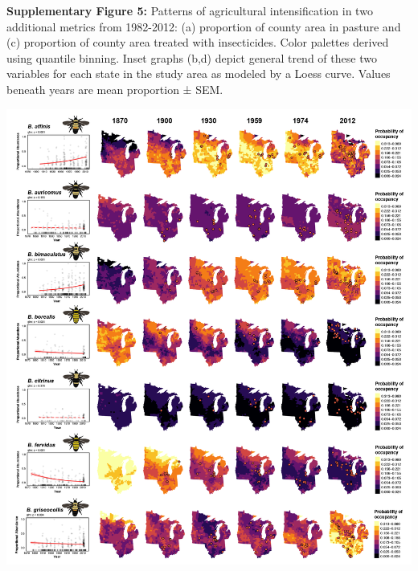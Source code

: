 \documentclass[11pt,]{article}
\begin{document}
\textbf{Supplementary Figure 5:} Patterns of agricultural
intensification in two additional metrics from 1982-2012: (a) proportion
of county area in pasture and (c) proportion of county area treated with
insecticides. Color palettes derived using quantile binning. Inset
graphs (b,d) depict general trend of these two variables for each state
in the study area as modeled by a Loess curve. Values beneath years are
mean proportion ± SEM.

\clearpage

\newpage

\includegraphics[width=1\textwidth,height=\textheight]{../ms_figs/fig4a.png}

\clearpage

\newpage
\end{document}
